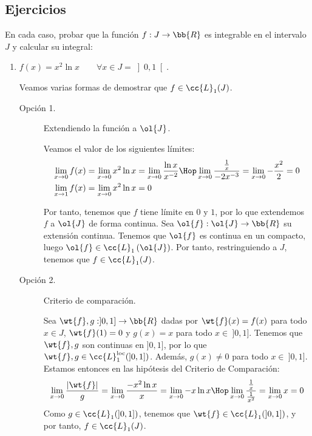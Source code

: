 \newpage
\subsection{Ejercicios}
\begin{ejercicio}
    En cada caso, probar que la función $f:J\to \bb{R}$ es integrable en el intervalo $J$ y calcular su integral:
    \begin{enumerate}
        \item $f(x)=x^2\ln x \qquad \forall x\in J=\left]0,1\right[$.
        
        Veamos varias formas de demostrar que $f\in \cc{L}_1(J)$.
        \begin{description}
            \item[Opción 1.] Extendiendo la función a $\ol{J}$.
            
            Veamos el valor de los siguientes límites:
            \begin{align*}
                \lim_{x\to 0} f(x) &= \lim_{x\to 0} x^2\ln x = \lim_{x\to 0} \dfrac{\ln x}{x^{-2}} \Hop \lim_{x\to 0} \dfrac{\frac{1}{x}}{-2x^{-3}} = \lim_{x\to 0} -\dfrac{x^2}{2} = 0\\
                \lim_{x\to 1} f(x) &= \lim_{x\to 0} x^2\ln x = 0
            \end{align*}

            Por tanto, tenemos que $f$ tiene límite en $0$ y $1$, por lo que extendemos $f$ a $\ol{J}$ de forma continua.
            Sea $\ol{f}:\ol{J}\to \bb{R}$ su extensión continua. Tenemos que $\ol{f}$ es continua en un compacto,
            luego $\ol{f}\in \cc{L}_1\left(\ol{J}\right)$. Por tanto, restringuiendo a $J$, tenemos que $f\in \cc{L}_1(J)$.

            \item[Opción 2.] Criterio de comparación.
            
            Sea $\wt{f},g:]0,1] \to \bb{R}$ dadas por $\wt{f}(x)=f(x)$ para todo $x\in J$, $\wt{f}(1)=0$ y $g(x)=x$ para todo $x\in~]0,1]$. Tenemos que
            $\wt{f},g$ son continuas en $]0,1]$, por lo que $\wt{f},g\in \cc{L}^{\text{loc}}_1(]0,1])$. Además, $g(x)\neq 0$ para todo $x\in~]0,1]$. Estamos entonces en las hipótesis del Criterio de Comparación:
            \begin{equation*}
                \lim_{x\to 0} \dfrac{|\wt{f}|}{g}
                = \lim_{x\to 0} \dfrac{-x^2\ln x}{x}
                = \lim_{x\to 0} -x\ln x
                \Hop \lim_{x\to 0} \dfrac{\frac{1}{x}}{\frac{1}{x^2}}
                = \lim_{x\to 0} x = 0
            \end{equation*}
            Como $g\in \cc{L}_1(]0,1])$, tenemos que $\wt{f}\in \cc{L}_1(]0,1])$, y por tanto, $f\in \cc{L}_1(J)$.
        \end{description}
        

\end{enumerate}
\end{ejercicio}
